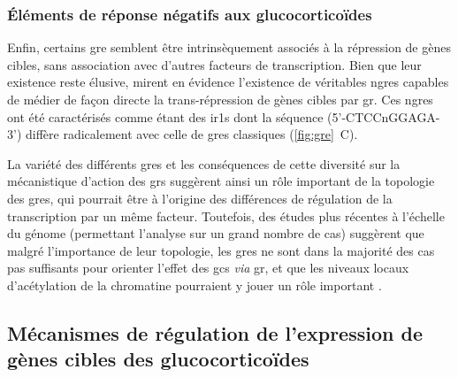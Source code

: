 \documentclass[../main.tex]{subfiles}
\begin{document}
\subsubsection{Éléments de réponse négatifs aux glucocorticoïdes}
Enfin, certains \gls{gre} semblent être intrinsèquement associés à la répression de gènes cibles, sans association avec d'autres facteurs de transcription.
Bien que leur existence reste élusive, \citet{Surjit2011} mirent en évidence l'existence de véritables \glspl{ngre} capables de médier de façon directe la trans-répression de gènes cibles par \gls{gr}.
Ces \glspl{ngre} ont été caractérisés comme étant des \glspl{ir1} dont la séquence (5'-CTCCnGGAGA-3') diffère radicalement avec celle de \glspl{gre} classiques (\autoref{fig:gre}~C).
\\
\par
La variété des différents \glspl{gre} et les conséquences de cette diversité sur la mécanistique d'action des \glspl{gr} suggèrent ainsi un rôle important de la topologie des \glspl{gre}, qui pourrait être à l'origine des différences de régulation de la transcription par un même facteur.
Toutefois, des études plus récentes à l'échelle du génome (permettant l'analyse sur un grand nombre de cas) suggèrent que malgré l'importance de leur topologie, les \glspl{gre} ne sont dans la majorité des cas pas suffisants pour orienter l'effet des \glspl{gc} \textit{via} \gls{gr}, et que les niveaux locaux d'acétylation de la chromatine pourraient y jouer un rôle important \citep{Uhlenhaut2013}.


\subsection{Mécanismes de régulation de l'expression de gènes cibles des glucocorticoïdes}\label{subsec:meca-action-gc-via-gr}
\end{document}

